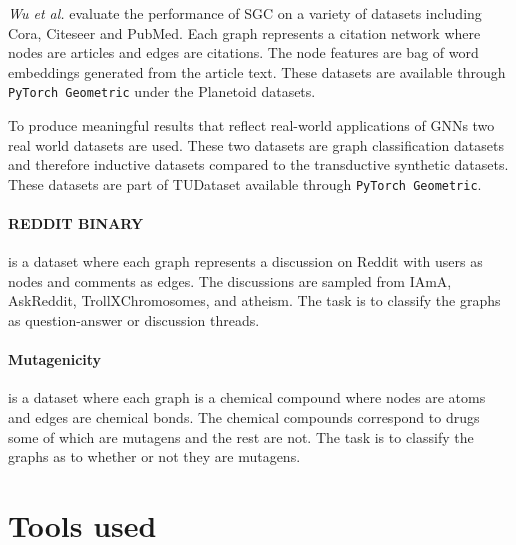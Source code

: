 
\textit{Wu et al.}\cite{wu2019simplifying} evaluate the performance of SGC on a variety of datasets including Cora, Citeseer and PubMed\cite{citation}.
Each graph represents a citation network where nodes are articles and edges are citations.
The node features are bag of word embeddings generated from the article text.
These datasets are available through \texttt{PyTorch Geometric}\cite{Fey/Lenssen/2019} under the Planetoid\cite{planetoid} datasets.

To produce meaningful results that reflect real-world applications of GNNs two real world datasets are used.
These two datasets are graph classification datasets and therefore inductive datasets compared to the transductive synthetic datasets.
These datasets are part of TUDataset \cite{Morris+2020} available through \texttt{PyTorch Geometric}\cite{Fey/Lenssen/2019}.

\paragraph{REDDIT BINARY}
is a dataset where each graph represents a discussion on Reddit with users as nodes and comments as edges.
The discussions are sampled from IAmA, AskReddit, TrollXChromosomes, and atheism.
The task is to classify the graphs as question-answer or discussion threads.

\paragraph{Mutagenicity}
is a dataset where each graph is a chemical compound where nodes are atoms and edges are chemical bonds.
The chemical compounds correspond to drugs some of which are mutagens and the rest are not.
The task is to classify the graphs as to whether or not they are mutagens.

\section{Tools used}


